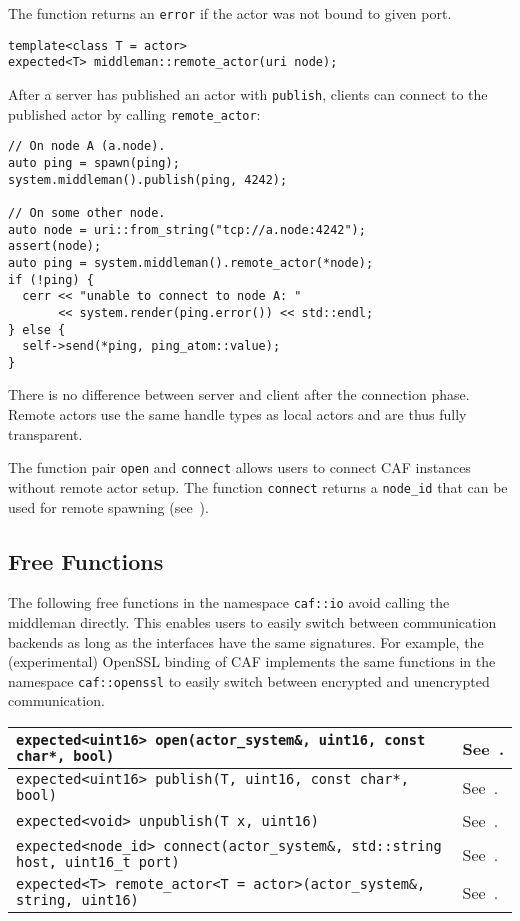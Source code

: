 The function returns an \lstinline^error^  if the actor was not
bound to given port.

\clearpage
\begin{lstlisting}
template<class T = actor>
expected<T> middleman::remote_actor(uri node);
\end{lstlisting}

After a server has published an actor with \lstinline^publish^, clients can
connect to the published actor by calling \lstinline^remote_actor^:

\begin{lstlisting}
// On node A (a.node).
auto ping = spawn(ping);
system.middleman().publish(ping, 4242);

// On some other node.
auto node = uri::from_string("tcp://a.node:4242");
assert(node);
auto ping = system.middleman().remote_actor(*node);
if (!ping) {
  cerr << "unable to connect to node A: "
       << system.render(ping.error()) << std::endl;
} else {
  self->send(*ping, ping_atom::value);
}
\end{lstlisting}

There is no difference between server and client after the connection phase.
Remote actors use the same handle types as local actors and are thus fully
transparent.

The function pair \lstinline^open^ and \lstinline^connect^ allows users to
connect CAF instances without remote actor setup. The function
\lstinline^connect^ returns a \lstinline^node_id^ that can be used for remote
spawning (see~).

\subsection{Free Functions}
\label{free-remoting-functions}

The following free functions in the namespace \lstinline^caf::io^ avoid calling
the middleman directly. This enables users to easily switch between
communication backends as long as the interfaces have the same signatures. For
example, the (experimental) OpenSSL binding of CAF implements the same
functions in the namespace \lstinline^caf::openssl^ to easily switch between
encrypted and unencrypted communication.

\begin{center}
\begin{tabular}{ll}
  \hline
  \lstinline^expected<uint16> open(actor_system&, uint16, const char*, bool)^ & See~. \\
  \hline
  \lstinline^expected<uint16> publish(T, uint16, const char*, bool)^ & See~. \\
  \hline
  \lstinline^expected<void> unpublish(T x, uint16)^ & See~. \\
  \hline
  \lstinline^expected<node_id> connect(actor_system&, std::string host, uint16_t port)^ & See~. \\
  \hline
  \lstinline^expected<T> remote_actor<T = actor>(actor_system&, string, uint16)^ & See~. \\
  \hline
\end{tabular}
\end{center}

